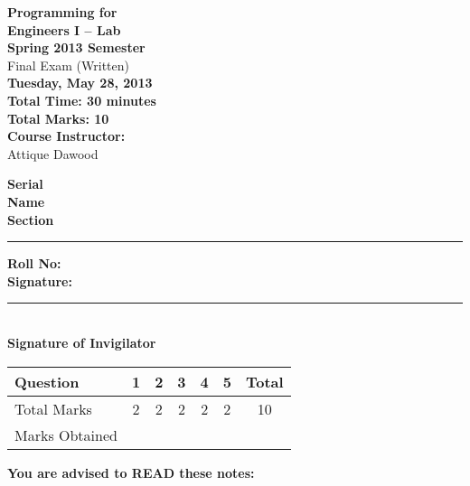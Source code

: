 \documentclass[12pt,a4paper]{article}
\def\QOne{2}
\def\Qtwo{2}
\def\Qthree{2}
\def\Qfour{2}
\def\Qfive{2}
\def\TotalMarks{10}
\begin{document}
\begin{minipage}{0.55\textwidth}
{\LARGE \textbf{Programming for\\ Engineers I -- Lab}}\\[0.15cm]
{\normalsize \textbf{Spring 2013 Semester}}\\
{\Large {Final Exam (Written)}}\\
{\normalsize \textbf{Tuesday, May 28, 2013}}\\[0.30cm]
{\Large \textbf{Total Time: 30 minutes}}\\[0.15cm]
{\Large \textbf{Total Marks: 10}}\\
\textbf{Course Instructor:}\\
Attique Dawood\\
\end{minipage}
\begin{minipage}{0.4\textwidth}
\textbf{Serial} \hrulefill \\[0.25cm]
\textbf{Name} \hrulefill\\[0.25cm]
\textbf{Section} \rule{1cm}{0.2mm} \textbf{Roll No:} \hrulefill\\[0.25cm]
\textbf{Signature:} \hrulefill\\[0.25cm]
\rule{6.6cm}{0.2mm}\\
\textbf{Signature of Invigilator}\\[0.25cm]
\end{minipage}
\begin{table}[H]
\begin{center}
\vspace{0.3cm}
	{\Large \begin{tabular}{|l|c|c|c|c|c|c|}
	\hline
		\rule{0pt}{2.6ex} Question & \textbf{1} & \textbf{2} & \textbf{3} & \textbf{4} & \textbf{5} & \textbf{Total}\\
		\hline
		Total Marks \rule{0pt}{2.6ex} & \QOne & \Qtwo & \Qthree & \Qfour & \Qfive & \TotalMarks\\
		\hline
		Marks Obtained & & & & & & \\
	\hline
	\end{tabular}}
\end{center}
\end{table}
\noindent \textbf{You are advised to READ these notes:}
\end{document}
